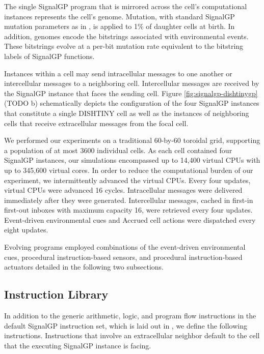 The single SignalGP program that is mirrored across the cell's computational instances represents the cell's genome.
Mutation, with standard SignalGP mutation parameters as in \cite{lalejini2018evolving}, is applied to 1\% of daughter cells at birth.
In addition, genomes encode the bitstrings associated with environmental events.
These bitstrings evolve at a per-bit mutation rate equivalent to the bitstring labels of SignalGP functions.

Instances within a cell may send intracellular messages to one another or intercellular messages to a neighboring cell.
Intercellular messages are received by the SignalGP instance that faces the sending cell.
Figure \ref{fig:signalgp-dishtinygp}(TODO b) schematically depicts the configuration of the four SignalGP instances that constitute a single DISHTINY cell as well as the instances of neighboring cells that receive extracellular messages from the focal cell.

We performed our experiments on a traditional 60-by-60 toroidal grid, supporting a population of at most 3600 individual cells.
As each cell contained four SignalGP instances, our simulations encompassed up to 14,400 virtual CPUs with up to 345,600 virtual cores.
In order to reduce the computational burden of our experiment, we intermittently advanced the virtual CPUs.
Every four updates, virtual CPUs were advanced 16 cycles.
Intracellular messages were delivered immediately after they were generated.
Intercellular messages, cached in first-in first-out inboxes with maximum capacity 16, were retrieved every four updates.
Event-driven environmental cues and Accrued cell actions were dispatched every eight updates.

Evolving programs employed combinations of the event-driven environmental cues, procedural instruction-based sensors, and procedural instruction-based actuators detailed in the following two subsections.

\subsection{Instruction Library}

In addition to the generic arithmetic, logic, and program flow instructions in the default SignalGP instruction set, which is laid out in \cite{lalejini2018evolving}, we define the following instructions.
Instructions that involve an extracellular neighbor default to the cell that the executing SignalGP instance is facing.

